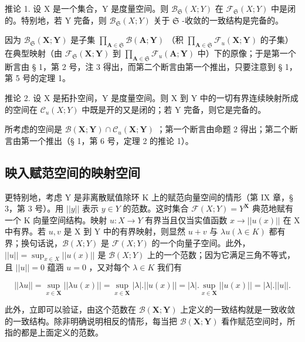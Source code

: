 推论 1. 设 X 是一个集合，Y 是度量空间。则 \(\mathcal{B}_{\mathfrak{S}}(X;Y)\) 在 \(\mathcal{F}_{\mathfrak{S}}(X;Y)\) 中是闭的。特别地，若 Y 完备，则 \(\mathcal{B}_{\mathfrak{S}}(X;Y)\) 关于 \(\mathfrak{S}\) -收敛的一致结构是完备的。

因为 \(\mathcal{B}_{\mathfrak{S}}(\mathbf{X};\mathbf{Y})\) 是子集 \(\prod_{\mathbf{A}\in \mathfrak{S}}\mathcal{B}(\mathbf{A};\mathbf{Y})\) （积 \(\prod_{\mathbf{A}\in \mathfrak{S}}\mathcal{F}_u(\mathbf{X};\mathbf{Y})\) 的子集）在典型映射（由 \(\mathcal{F}_{\mathfrak{S}}(\mathbf{X};\mathbf{Y})\) 到 \(\prod_{\mathbf{A}\in \mathfrak{S}}\mathcal{F}_u(\mathbf{A};\mathbf{Y})\) 中）下的原像；于是第一个断言由 § 1，第 2 号，注 3 得出，而第二个断言由第一个推出，只要注意到 § 1，第 5 号的定理 1。

推论 2. 设 X 是拓扑空间，Y 是度量空间。则 X 到 Y 中的一切有界连续映射所成的空间在 \(\mathcal{C}_u(X;Y)\) 中既是开的又是闭的；若 Y 完备，则它是完备的。

所考虑的空间是 \(\mathcal{B}(\mathbf{X};\mathbf{Y})\cap \mathcal{C}_u(\mathbf{X};\mathbf{Y})\) ；第一个断言由命题 2 得出；第二个断言由第一个推出（§ 1，第 6 号，定理 2 的推论 1）。

\subsection{映入赋范空间的映射空间}

更特别地，考虑 Y 是非离散赋值除环 K 上的赋范向量空间的情形（第 IX 章，§ 3，第 3 号）。用 \(||y||\) 表示 \(y \in Y\) 的范数。这时集合 \(\mathcal{F}(X;Y) = Y^{\mathbf{X}}\) 典范地赋有一个 K 向量空间结构。映射 \(u: X \to Y\) 有界当且仅当实值函数 \(x \to ||u(x)||\) 在 X 中有界。若 \(u, v\) 是 X 到 Y 中的有界映射，则显然 \(u + v\) 与 \(\lambda u (\lambda \in K)\) 都有界；换句话说，\(\mathcal{B}(X;Y)\) 是 \(\mathcal{F}(X;Y)\) 的一个向量子空间。此外，\(||u|| = \sup_{x \in X} ||u(x)||\) 是 \(\mathcal{B}(X;Y)\) 上的一个范数；因为它满足三角不等式，且 \(||u|| = 0\) 蕴涵 \(u = 0\) ，又对每个 \(\lambda \in K\) 我们有

\[
| | \lambda u | | = \sup _ {x \in \mathbf {X}} | | \lambda u (x) | | = \sup _ {x \in \mathbf {X}} | \lambda |. | | u (x) | | = | \lambda |. \sup _ {x \in \mathbf {X}} | | u (x) | | = | \lambda |. | | u | |.
\]

此外，立即可以验证，由这个范数在 \(\mathcal{B}(\mathbf{X};\mathbf{Y})\) 上定义的一致结构就是一致收敛的一致结构。除非明确说明相反的情形，每当把 \(\mathcal{B}(\mathbf{X};\mathbf{Y})\) 看作赋范空间时，所指的都是上面定义的范数。

